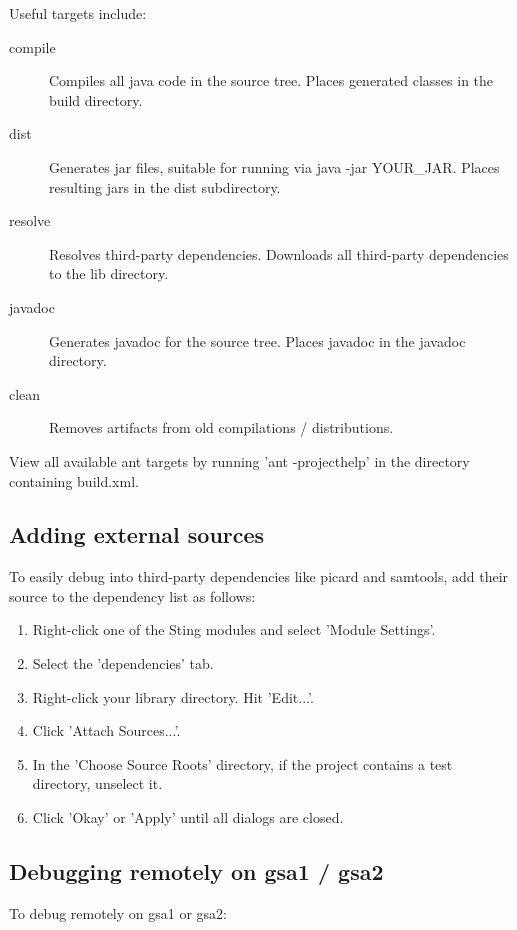 \documentclass[11pt,fullpage]{article}
\begin{document}
Useful targets include:
\begin{description}
  \item[compile] Compiles all java code in the source tree.  Places generated classes in the build directory.
  \item[dist] Generates jar files, suitable for running via java -jar {YOUR\_JAR}.  Places resulting jars in the dist subdirectory.
  \item[resolve] Resolves third-party dependencies.  Downloads all third-party dependencies to the lib directory.
  \item[javadoc] Generates javadoc for the source tree.  Places javadoc in the javadoc directory.
  \item[clean] Removes artifacts from old compilations / distributions.
\end{description}
View all available ant targets by running 'ant -projecthelp' in the directory containing build.xml.

\subsection{Adding external sources}
To easily debug into third-party dependencies like picard and samtools, add their source to the dependency list as follows:

\begin{enumerate}
  \item Right-click one of the Sting modules and select 'Module Settings'.
  \item Select the 'dependencies' tab.
  \item Right-click your library directory.  Hit 'Edit...'.
  \item Click 'Attach Sources...'.
  \item In the 'Choose Source Roots' directory, if the project contains a test directory, unselect it.
  \item Click 'Okay' or 'Apply' until all dialogs are closed.
\end{enumerate}

\subsection{Debugging remotely on gsa1 / gsa2}
To debug remotely on gsa1 or gsa2:
\end{document}
